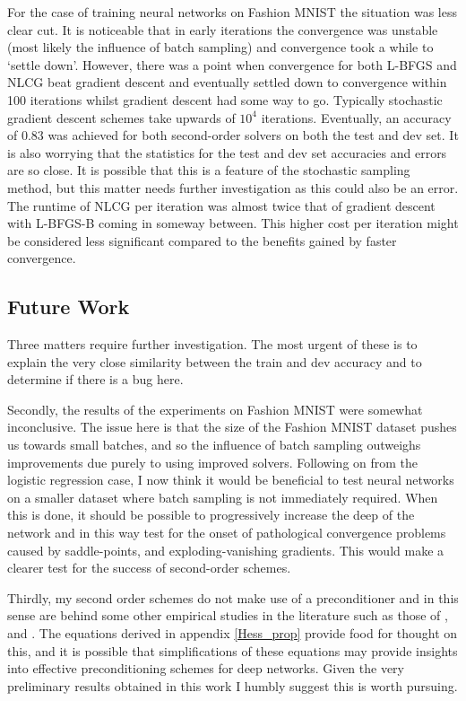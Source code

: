 \documentclass[11pt,twocolumn]{article}
\begin{document}
For the case of training neural networks on Fashion MNIST the situation was less clear cut. It is noticeable that in early iterations the convergence was unstable (most likely the influence of batch sampling) and convergence took a while to `settle down'. However, there was a point when convergence for both L-BFGS and NLCG beat gradient descent and eventually settled down to convergence within 100 iterations whilst gradient descent had some way to go. Typically stochastic gradient descent schemes take upwards of $10^4$ iterations. Eventually, an accuracy of $0.83$ was achieved for both second-order solvers on both the test and dev set. It is also worrying that the statistics for the test and dev set accuracies and errors are so close. It is possible that this is a feature of the stochastic sampling method, but this matter needs further investigation as this could also be an error. The runtime of NLCG per iteration was almost twice that of gradient descent with L-BFGS-B coming in someway between. This higher cost per iteration might be considered less significant compared to the benefits gained by faster convergence.

\subsection{Future Work}
Three matters require further investigation. The most urgent of these is to explain the very close similarity between the train and dev accuracy and to determine if there is a bug here. 

Secondly, the results of the experiments on Fashion MNIST were somewhat inconclusive. The issue here is that the size of the Fashion MNIST dataset pushes us towards small batches, and so the influence of batch sampling outweighs improvements due purely to using improved solvers. Following on from the logistic regression case, I now think it would be beneficial to test neural networks on a smaller dataset where batch sampling is not immediately required. When this is done, it should be possible to progressively increase the deep of the network and in this way test for the onset of pathological convergence problems caused by saddle-points, and exploding-vanishing gradients. This would make a clearer test for the success of second-order schemes. 

Thirdly, my second order schemes do not make use of a preconditioner and in this sense are behind some other empirical studies in the literature such as those of \cite{Martens:Deep}, \cite{Xu:2ndNCML} and \cite{Asi:BetterStoch}. The equations derived in appendix \ref{Hess_prop} provide food for thought on this, and it is possible that simplifications of these equations may provide insights into effective preconditioning schemes for deep networks. Given the very preliminary results obtained in this work I humbly suggest this is worth pursuing. 
\end{document}
